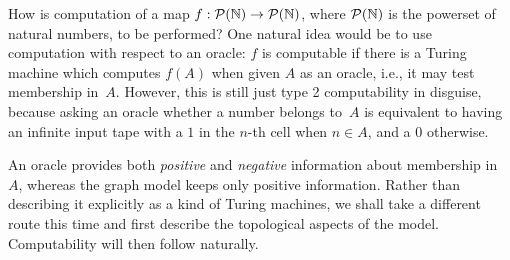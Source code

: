 How is computation of a map $f : \mathcal{P}(\mathbb{N}) \to \mathcal{P}(\mathbb{N})$, where
$\mathcal{P}(\mathbb{N})$ is the powerset of natural numbers, to be performed? One
natural idea would be to use computation with respect to an oracle:
$f$ is computable if there is a Turing machine which computes $f(A)$
when given $A$ as an oracle, i.e., it may test membership in~$A$.
However, this is still just type 2 computability in disguise, because
asking an oracle whether a number belongs to~$A$ is equivalent to
having an infinite input tape with a $1$ in the $n$-th cell when $n
\in A$, and a $0$ otherwise.

An oracle provides both \emph{positive} and \emph{negative}
information about membership in~$A$, whereas the graph model keeps
only positive information. Rather than describing it explicitly as a
kind of Turing machines, we shall take a different route this time and
first describe the topological aspects of the model. Computability
will then follow naturally.

